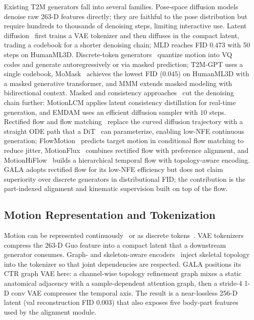 \documentclass[journal]{IEEEtran}
\begin{document}
Existing T2M generators fall into several families. Pose-space diffusion models~\cite{tevet2023mdm,zhang2022motiondiffuse,ho2020ddpm} denoise raw 263-D features directly; they are faithful to the pose distribution but require hundreds to thousands of denoising steps, limiting interactive use. Latent diffusion~\cite{chen2023mld,rombach2022ldm} first trains a VAE tokenizer and then diffuses in the compact latent, trading a codebook for a shorter denoising chain; MLD reaches FID $0.473$ with 50 steps on HumanML3D. Discrete-token generators~\cite{zhang2023t2mgpt,guo2024momask,kong2023m2dm,pinyoanuntapong2024mmm} quantize motion into VQ codes and generate autoregressively or via masked prediction; T2M-GPT uses a single codebook, MoMask~\cite{guo2024momask} achieves the lowest FID ($0.045$) on HumanML3D with a masked generative transformer, and MMM extends masked modeling with bidirectional context. Masked and consistency approaches~\cite{dai2024motionlcm,zhou2024emdm} cut the denoising chain further: MotionLCM applies latent consistency distillation for real-time generation, and EMDAM uses an efficient diffusion sampler with $10$ steps. Rectified flow and flow matching~\cite{liu2023rectified,lipman2023flow} replace the curved diffusion trajectory with a straight ODE path that a DiT~\cite{peebles2023dit} can parameterize, enabling low-NFE continuous generation; FlowMotion~\cite{cuba2025flowmotion} predicts target motion in conditional flow matching to reduce jitter, MotionFlux~\cite{gao2025motionflux} combines rectified flow with preference alignment, and MotionHiFlow~\cite{li2026motionhiflow} builds a hierarchical temporal flow with topology-aware encoding. GALA adopts rectified flow for its low-NFE efficiency but does not claim superiority over discrete generators in distributional FID; the contribution is the part-indexed alignment and kinematic supervision built on top of the flow.

\subsection{Motion Representation and Tokenization}
\label{sec:rw-tok}

Motion can be represented continuously~\cite{guo2022humanml3d} or as discrete tokens~\cite{zhang2023t2mgpt,guo2024momask}. VAE tokenizers~\cite{kingma2014vae,chen2023mld} compress the 263-D Guo feature into a compact latent that a downstream generator consumes. Graph- and skeleton-aware encoders~\cite{yan2018stgcn,chen2021ctrgcn,wang2023graphmotion} inject skeletal topology into the tokenizer so that joint dependencies are respected. GALA positions its CTR graph VAE here: a channel-wise topology refinement graph mixes a static anatomical adjacency with a sample-dependent attention graph, then a stride-4 1-D conv VAE compresses the temporal axis. The result is a near-lossless 256-D latent (val reconstruction FID $0.003$) that also exposes five body-part features used by the alignment module.
\end{document}
